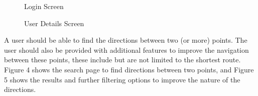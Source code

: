 \documentclass{article}
\begin{document}
\begin{figure}[H]
	\caption{Login Screen}
	\endminipage\hfill
	\caption{User Details Screen}
	\endminipage\hfill
\end{figure}

A user should be able to find the directions between two (or more) points. The user should also be provided with additional features to improve the navigation between these points, these include but are not limited to the shortest route. Figure 4 shows the search page to find directions between two points, and Figure 5 shows the results and further filtering options to improve the nature of the directions.\\
\end{document}
